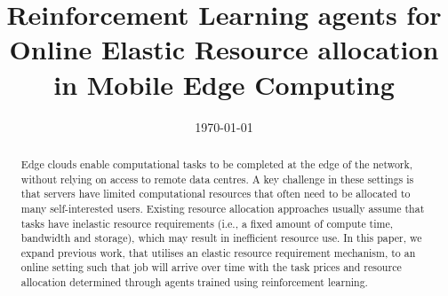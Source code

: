 \documentclass[sotoncolour]{extra/uos_project}     %
\title       {Reinforcement Learning agents for Online Elastic Resource allocation in Mobile Edge Computing}
\date       {\today}
\begin{document}
\frontmatter
\maketitle
\begin{abstract}
Edge clouds enable computational tasks to be completed at the edge of the network, without relying on access to remote
data centres. A key challenge in these settings is that servers have limited computational resources that often need to
be allocated to many self-interested users. Existing resource allocation approaches usually assume that tasks have
inelastic resource requirements (i.e., a fixed amount of compute time, bandwidth and storage), which may result in
inefficient resource use. In this paper, we expand previous work, that utilises an elastic resource requirement
mechanism, to an online setting such that job will arrive over time with the task prices and resource allocation
determined through agents trained using reinforcement learning.
\end{abstract}

\tableofcontents

\end{document}
